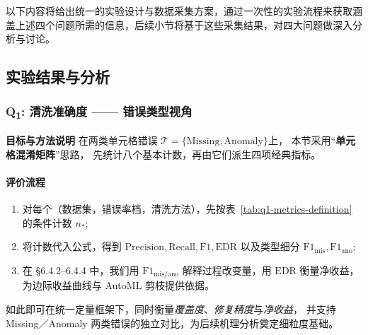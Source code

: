 \documentclass[10pt]{article} %
\numberwithin{equation}{section}
\begin{document}
\noindent
以下内容将给出统一的实验设计与数据采集方案，通过一次性的实验流程来获取涵盖上述四个问题所需的信息，后续小节将基于这些采集结果，对四大问题做深入分析与讨论。

\subsection{实验结果与分析}
\label{sec:exp_results}

\subsubsection{Q\textsubscript{1}: 清洗准确度 —— 错误类型视角}
\label{sec:q1-accuracy}

\textbf{目标与方法说明}\quad
在两类单元格错误 
\(\mathcal{T}=\{\mathrm{Missing},\mathrm{Anomaly}\}\)上，
本节采用“\textbf{单元格混淆矩阵}”思路，
先统计八个基本计数，再由它们派生四项经典指标。

\paragraph{评价流程}\;
\begin{enumerate}[label=\textbf{Step\,\arabic*.},itemindent=4em,leftmargin=0pt]
  \item 对每个（数据集，错误率档，清洗方法），先按表~\ref{tab:q1-metrics-definition} 的条件计数 \(n_{\ast}\);
  \item 将计数代入公式，得到 \(\mathrm{Precision},\mathrm{Recall},\mathrm{F1},\mathrm{EDR}\) 以及类型细分 \(\mathrm{F1}_{\mathrm{mis}},\mathrm{F1}_{\mathrm{ano}}\);
  \item 在 §6.4.2–6.4.4 中，我们用 \(\mathrm{F1}_{\mathrm{mis}/\mathrm{ano}}\) 解释过程改变量，用 \(\mathrm{EDR}\) 衡量净收益，为边际收益曲线与 AutoML 剪枝提供依据。
\end{enumerate}

\noindent
如此即可在统一定量框架下，同时衡量\emph{覆盖度}、\emph{修复精度}与\emph{净收益}，
并支持 Missing／Anomaly 两类错误的独立对比，为后续机理分析奠定细粒度基础。
\end{document}
